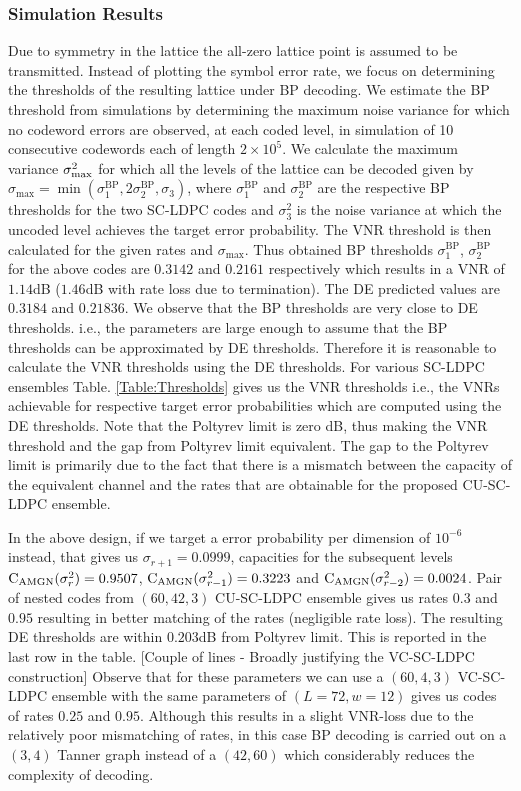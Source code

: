 \subsubsection*{Simulation Results}
Due to symmetry in the lattice the all-zero lattice point is assumed to be transmitted. Instead of plotting the symbol error rate, we focus on determining the thresholds of the resulting lattice under BP decoding. We estimate the BP threshold from simulations by determining the maximum noise variance for which no codeword errors are observed, at each coded level, in simulation of 10 consecutive codewords each of length $2\times 10^{5}$. We calculate the maximum variance $\sigma_{\text{max}}^{2}$ for which all the levels of the lattice can be decoded given by $\sigma_{\text{max}}=\min(\sigma_{1}^{\text{BP}},2\sigma_{2}^{\text{BP}},\sigma_{3})$, where $\sigma_{1}^{\text{BP}}$ and $\sigma_{2}^{\text{BP}}$ are the respective BP thresholds for the two SC-LDPC codes and $\sigma_{3}^{2}$ is the noise variance at which the uncoded level achieves the target error probability. The VNR threshold is then calculated for the given rates and $\sigma_{\text{max}}$. Thus obtained BP thresholds $\sigma_{1}^{\text{BP}}$, $\sigma_{2}^{\text{BP}}$ for the above codes are $0.3142$ and $0.2161$ respectively which results in a VNR of $1.14$dB ($1.46$dB with rate loss due to termination). The DE predicted values are $0.3184$ and $0.21836$. We observe that the BP thresholds are very close to DE thresholds. i.e., the parameters are large enough to assume that the BP thresholds can be approximated by DE thresholds. Therefore it is reasonable to calculate the VNR thresholds using the DE thresholds. For various SC-LDPC ensembles Table. \ref{Table:Thresholds} gives us the VNR thresholds i.e., the VNRs achievable for respective target error probabilities which are computed using the DE thresholds. Note that the Poltyrev limit is zero dB, thus making the VNR threshold and the gap from Poltyrev limit equivalent. The gap to the Poltyrev limit is primarily due to the fact that there is a mismatch between the capacity of the equivalent channel and the rates that are obtainable for the proposed CU-SC-LDPC ensemble.  

In the above design, if we target a error probability per dimension of $10^{-6}$  instead, that gives us $\sigma_{r+1}= 0.0999$, capacities for the subsequent levels $\text{C}_{\text{AMGN}}(\sigma^{2}_{r})=0.9507$, $\text{C}_{\text{AMGN}}(\sigma^{2}_{r-1})=0.3223$ and $\text{C}_{\text{AMGN}}(\sigma^{2}_{r-2})=0.0024$. Pair of nested codes from $(60,42,3)$ CU-SC-LDPC ensemble gives us rates $0.3$ and $0.95$ resulting in better matching of the rates (negligible rate loss). The resulting DE thresholds are within $0.203$dB from Poltyrev limit. This is reported in the last row in the table. [Couple of lines - Broadly justifying the VC-SC-LDPC construction] Observe that for these parameters we can use a $(60,4,3)$ VC-SC-LDPC ensemble with the same parameters of $(L=72,w=12)$ gives us codes of rates $0.25$ and $0.95$. Although this results in a slight VNR-loss due to the relatively poor mismatching of rates, in this case BP decoding is carried out on a $(3,4)$ Tanner graph instead of a $(42,60)$ which considerably reduces the complexity of decoding.

